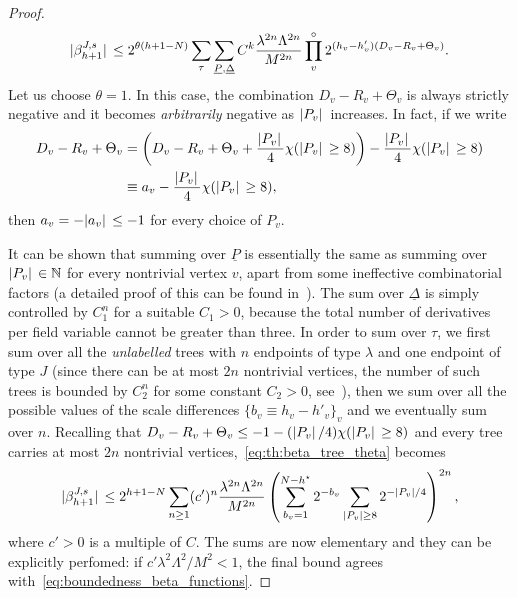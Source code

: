 \documentclass[a4paper, 11pt]{article}
\newcommand{\N}{\mathbb{N}}
\newcommand{\cutoff}{\Lambda}								%
\theoremstyle{thm}
\begin{document}
\begin{proof}
\begin{equation}
\label{eq:th:beta_tree_theta}
\abs*{\beta^{J, s}_{h+1}} \le 2^{\theta (h+1-N)} \sum_\tau \sum_{\underline{P}, \underline{\Delta}} C^k \frac{\lambda^{2n} \cutoff^{2n}}{M^{2n}} \prod^\circ_v 2^{(h_v - h'_v)(D_v - R_v + \Theta_v)}.
\end{equation}
Let us choose $\theta = 1$. In this case, the combination $D_v - R_v + \Theta_v$ is always strictly negative and it becomes \emph{arbitrarily} negative as $\abs*{P_v}$ increases. In fact, if we write
\begin{align*}
\notag
D_v - R_v + \Theta_v 
& = \left( D_v - R_v + \Theta_v + \frac{\abs*{P_v}}{4} \chi(\abs*{P_v} \ge 8) \right) - \frac{\abs*{P_v}}{4} \chi(\abs*{P_v} \ge 8) \\
& \equiv a_v - \frac{\abs*{P_v}}{4} \chi(\abs*{P_v} \ge 8),
\end{align*} 
then $a_v = - \abs*{a_v} \le -1$ for every choice of $P_v$. 

It can be shown that summing over $\underline{P}$ is essentially the same as summing over $\abs*{P_v} \in \N$ for every nontrivial vertex $v$, apart from some ineffective combinatorial factors (a detailed proof of this can be found in~\cite[Appendix A.6.1]{Gentile_2001}). The sum over $\underline{\Delta}$ is simply controlled by $C_1^n$ for a suitable $C_1 > 0$, because the total number of derivatives per field variable cannot be greater than three. In order to sum over $\tau$, we first sum over all the \emph{unlabelled} trees with $n$ endpoints of type $\lambda$ and one endpoint of type $J$ (since there can be at most $2n$ nontrivial vertices, the number of such trees is bounded by $C_2^n$ for some constant $C_2 > 0$, see~\cite[Lemma 2.1]{Mastropietro_Nonpert_Renorm}), then we sum over all the possible values of the scale differences $\lbrace b_v \equiv h_v - h'_v \rbrace_v$ and we eventually sum over $n$. Recalling that $D_v - R_v + \Theta_v \le -1 - (\abs*{P_v}/4)\chi(\abs*{P_v} \ge 8)$ and every tree carries at most $2n$ nontrivial vertices,~\eqref{eq:th:beta_tree_theta} becomes
\begin{equation}
\label{eq:th:sum_over_P_Delta}
\abs*{\beta^{J, s}_{h+1}} \le 2^{h+1-N} \sum_{n \ge 1} (c')^n \frac{\lambda^{2n} \cutoff^{2n}}{M^{2n}} \left(\sum_{b_v = 1}^{N - h^\star} 2^{- b_v} \sum_{\abs*{P_v} \ge 8} 2^{-\abs*{P_v}/4} \right)^{2n},
\end{equation}
where $c' > 0$ is a multiple of $C$. The sums are now elementary and they can be explicitly perfomed: if $c' \lambda^2 \cutoff^2/M^2 < 1$, the final bound agrees with~\eqref{eq:boundedness_beta_functions}.


\end{proof}
\end{document}

